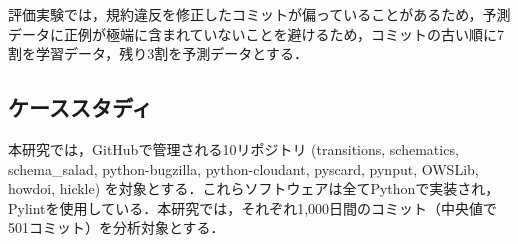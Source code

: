\documentclass[uplatex,dvipdfmx,a4paper,twocolumn,base=11pt,jbase=11pt,ja=standard]{bxjsarticle}  %
\begin{document}
評価実験では，規約違反を修正したコミットが偏っていることがあるため，予測データに正例が極端に含まれていないことを避けるため，コミットの古い順に7割を学習データ，残り3割を予測データとする．








\subsection{ケーススタディ}
本研究では，GitHubで管理される10リポジトリ (transitions, schematics, schema\_salad, python-bugzilla, python-cloudant, pyscard, pynput, OWSLib, howdoi, hickle) を対象とする．これらソフトウェアは全てPythonで実装され，Pylintを使用している．本研究では，それぞれ1,000日間のコミット（中央値で501コミット）を分析対象とする．






%
\end{document}
